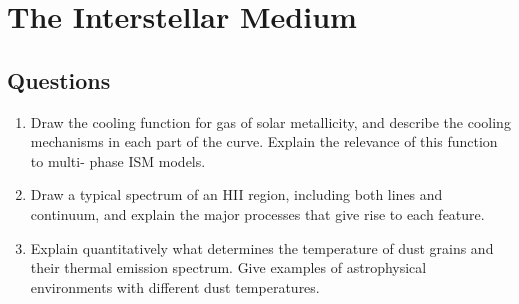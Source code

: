 \section{The Interstellar Medium}
\subsection{Questions}
\begin{enumerate}
\item Draw the cooling function for gas of solar metallicity, and describe the cooling
      mechanisms in each part of the curve. Explain the relevance of this function to multi-
      phase ISM models.
\item Draw a typical spectrum of an HII region, including both lines and continuum, and
      explain the major processes that give rise to each feature.
\item Explain quantitatively what determines the temperature of dust grains and their
      thermal emission spectrum. Give examples of astrophysical environments with different
      dust temperatures.
\end{enumerate}

